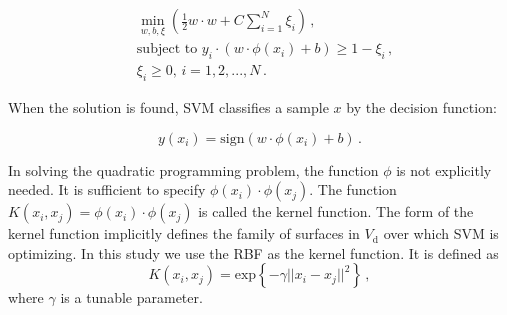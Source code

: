 \documentclass[prd, twocolumn, lengthcheck, superscriptaddress, showpacs, letterpaper, nofootinbib]{revtex4-1}
\newcommand\auxvec{x}
\newcommand\Vdata{V_\mathrm{d}}
\begin{document}
\begin{subequations}
\label{SVMprogproblem}
\begin{flalign}
&\min_{w, b, \xi} \left(\frac {1}{2} w \cdot w + C \sum_{i=1}^{N} \xi_i \right)\,, \\
&\text{subject to  } y_i \cdot (w \cdot \phi(\auxvec_i)+b) \ge 1-\xi_i \,, \\
&\xi_i \ge 0, \, i=1, 2, ..., N \,.
 \end{flalign}
\end{subequations}

\noindent When the solution is found, \ac{SVM} classifies a sample $\auxvec$ by the decision function:

\begin{equation}
\label{SVMdecfunction}
y(\auxvec_i) = \mathrm{sign}\left(w \cdot \phi(\auxvec_i) + b \right)\,.
\end{equation}

In solving the quadratic programming problem, the function $\phi$ is not explicitly needed. It is sufficient to specify $\phi(\auxvec_i) \cdot \phi(\auxvec_j)$. The function $K(\auxvec_i, \auxvec_j) = \phi(\auxvec_i) \cdot \phi(\auxvec_j)$ is called the kernel function. The form of the kernel function implicitly  defines the family of surfaces in $\Vdata$ over which {SVM} is optimizing. In this study we use the \ac{RBF} as the kernel function. It is defined as
\begin{equation}
K(\auxvec_i, \auxvec_j) = \mathrm{exp}\left\{-\gamma || \auxvec_i - \auxvec_j ||^2\right\}\,,
\end{equation}
where $\gamma$ is a tunable parameter.

\end{document}
